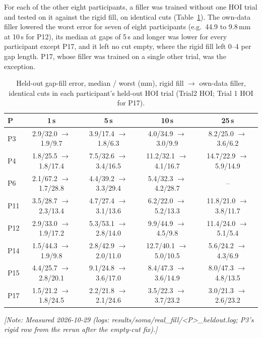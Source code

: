 \documentclass[11pt,a4paper]{article}
\newcommand{\note}[1]{\textcolor{orange!80!black}{\textit{[Note: #1]}}}
\begin{document}
For each of the other eight participants, a filler was trained without one HOI trial and tested on it against the
rigid fill, on identical cuts (Table~\ref{tab:gapfill-cohort}). The own-data filler lowered the worst error for seven of
eight participants (e.g.\ 44.9 to 9.8\,mm at 10\,s for P12), its median at gaps of 5\,s and longer was lower for every
participant except P17, and it left no cut empty, where the rigid fill left 0--4 per gap length. P17, whose filler was
trained on a single other trial, was the exception.
\begin{table}[h]\centering\small
\caption{Held-out gap-fill error, median / worst (mm), rigid fill $\rightarrow$ own-data filler, identical cuts in each
participant's held-out HOI trial (Trial2 HOI; Trial 1 HOI for P17).}\label{tab:gapfill-cohort}
\begin{tabular}{lcccc}\toprule
P & 1\,s & 5\,s & 10\,s & 25\,s \\\midrule
P3 & 2.9/32.0 $\rightarrow$ 1.9/9.7 & 3.9/17.4 $\rightarrow$ 1.8/6.3 & 4.0/34.9 $\rightarrow$ 3.0/9.9 & 8.2/25.0 $\rightarrow$ 3.6/6.2 \\
P4 & 1.8/25.5 $\rightarrow$ 1.8/17.4 & 7.5/32.6 $\rightarrow$ 3.4/16.5 & 11.2/32.1 $\rightarrow$ 4.1/16.7 & 14.7/22.9 $\rightarrow$ 5.9/14.9 \\
P6 & 2.1/67.2 $\rightarrow$ 1.7/28.8 & 4.4/39.2 $\rightarrow$ 3.3/29.4 & 5.4/32.3 $\rightarrow$ 4.2/28.7 & -- \\
P11 & 3.5/28.7 $\rightarrow$ 2.3/13.4 & 4.7/27.4 $\rightarrow$ 3.1/13.6 & 6.2/22.0 $\rightarrow$ 5.2/13.3 & 11.8/21.0 $\rightarrow$ 3.8/11.7 \\
P12 & 2.9/33.0 $\rightarrow$ 1.9/17.2 & 5.3/53.1 $\rightarrow$ 2.8/14.0 & 9.9/44.9 $\rightarrow$ 4.5/9.8 & 11.4/24.0 $\rightarrow$ 5.1/5.4 \\
P14 & 1.5/44.3 $\rightarrow$ 1.9/9.8 & 2.8/42.9 $\rightarrow$ 2.0/11.0 & 12.7/40.1 $\rightarrow$ 5.0/10.5 & 5.6/24.2 $\rightarrow$ 4.3/6.9 \\
P15 & 4.4/25.7 $\rightarrow$ 2.8/20.1 & 9.1/24.8 $\rightarrow$ 3.6/17.0 & 8.4/47.3 $\rightarrow$ 3.6/14.9 & 8.0/47.3 $\rightarrow$ 4.8/13.5 \\
P17 & 1.5/21.2 $\rightarrow$ 1.8/24.5 & 2.2/21.8 $\rightarrow$ 2.1/24.6 & 3.5/22.3 $\rightarrow$ 3.7/23.2 & 3.0/21.3 $\rightarrow$ 2.6/23.2 \\\bottomrule
\end{tabular}
\end{table}
\note{Measured 2026-10-29 (logs: results/soma/real\_fill/<P>\_heldout.log; P3's rigid row from the rerun after the empty-cut fix).}
\end{document}
